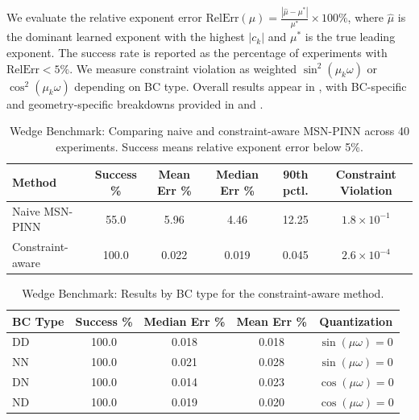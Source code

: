 \documentclass{article}
\theoremstyle{plain}
\theoremstyle{definition}
\theoremstyle{remark}
\begin{document}
We evaluate the relative exponent error $\text{RelErr}(\mu) = \frac{|\hat{\mu} - \mu^*|}{\mu^*} \times 100\%$, where $\hat{\mu}$ is the dominant learned exponent with the highest $|c_k|$ and $\mu^*$ is the true leading exponent. The success rate is reported as the percentage of experiments with $\text{RelErr} < 5\%$. We measure constraint violation as weighted $\sin^2(\mu_k\omega)$ or $\cos^2(\mu_k\omega)$ depending on BC type. Overall results appear in , with BC-specific and geometry-specific breakdowns provided in  and .

\begin{table}[h!]
	\centering
	\caption{Wedge Benchmark: Comparing naive and constraint-aware MSN-PINN across 40 experiments. Success means relative exponent error below 5\%.}
	\label{tab:exp6_summary}
	\begin{tabular}{lccccc}
		\arrayrulecolor{tablerule}\toprule
		\rowcolor{tableheader}
		Method           & Success \% & Mean Err \% & Median Err \% & 90th pctl. & Constraint Violation \\
		\midrule
		Naive MSN-PINN   & 55.0       & 5.96        & 4.46          & 12.25      & $1.8 \times 10^{-1}$ \\
		\rowcolor{tablerowalt}
		Constraint-aware & 100.0      & 0.022       & 0.019         & 0.045      & $2.6 \times 10^{-4}$ \\
		\bottomrule
	\end{tabular}
\end{table}

\begin{table}[h!]
	\centering
	\caption{Wedge Benchmark: Results by BC type for the constraint-aware method.}
	\label{tab:exp6_by_bc}
	\begin{tabular}{lcccc}
		\arrayrulecolor{tablerule}\toprule
		\rowcolor{tableheader}
		BC Type & Success \% & Median Err \% & Mean Err \% & Quantization        \\
		\midrule
		DD      & 100.0      & 0.018         & 0.018       & $\sin(\mu\omega)=0$ \\
		\rowcolor{tablerowalt}
		NN      & 100.0      & 0.021         & 0.028       & $\sin(\mu\omega)=0$ \\
		DN      & 100.0      & 0.014         & 0.023       & $\cos(\mu\omega)=0$ \\
		\rowcolor{tablerowalt}
		ND      & 100.0      & 0.019         & 0.020       & $\cos(\mu\omega)=0$ \\
		\bottomrule
	\end{tabular}
\end{table}
\end{document}
